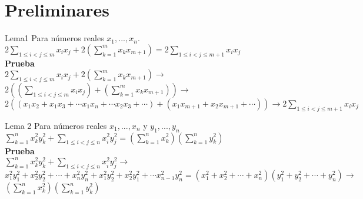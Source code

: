 \section{Preliminares}

\begin{frame}{Lema1}
Para números reales $x_{1},...,x_{n}$.
$2 \sum_{1 \leq i<j \leq m}x_{i}x_{j} + 2(\sum_{k=1}^{m} x_{k}x_{m+1}) = 2 \sum_{1 \leq i<j \leq m+1}x_{i}x_{j}$ \\ 
\textbf{Prueba} \\ 
$2 \sum_{1 \leq i<j \leq m}x_{i}x_{j} + 2(\sum_{k=1}^{m} x_{k}x_{m+1}) \to $
$2((\sum_{1 \leq i<j \leq m}x_{i}x_{j}) + (\sum_{k=1}^{m} x_{k}x_{m+1}) ) \to $ \\
$2((x_{1}x_{2}+x_{1}x_{3}+ \cdots x_{1}x_{n} + \cdots x_{2}x_{3} + \cdots) + (x_{1}x_{m+1}+x_{2}x_{m+1}+ \cdots) ) \to 2 \sum_{1 \leq i<j \leq m+1} x_{i}x_{j}$ 
    
\end{frame}
\begin{frame}{Lema 2}
Para números reales $x_{1},...,x_{n}$ y $y_{1},...,y_{n}$ \\ 
$\sum_{k=1}^{n} x^{2}_{k}y^{2}_{k} +  \sum_{1 \leq i < j \leq n} x^{2}_{i}y^{2}_{j}  = (\sum_{k=1}^{n} x^{2}_{k})(\sum_{k=1}^{n} y^{2}_{k})$ \\
\textbf{Prueba} \\ 
$\sum_{k=1}^{n} x^{2}_{k}y^{2}_{k} +  \sum_{1 \leq i < j \leq n} x^{2}_{i}y^{2}_{j} \to$ \\
$x^{2}_{1}y^{2}_{1}+x^{2}_{2}y^{2}_{2}+\cdots+ x^{2}_{n}y^{2}_{n}+x^{2}_{1}y^{2}_{2}+x^{2}_{2}y^{2}_{1}+\cdots x^{2}_{n-1}y^{2}_{n} =(x^{2}_{1}+x^{2}_{2}+ \cdots + x^{2}_{n})(y^{2}_{1}+y^{2}_{2}+\cdots+y^{2}_{n}) \to $ \\ 
$(\sum_{k=1}^{n} x^{2}_{k})(\sum_{k=1}^{n} y^{2}_{k})$
\end{frame}

